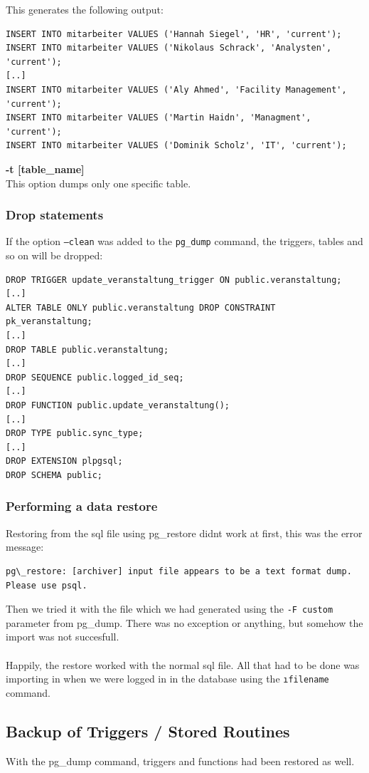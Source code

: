 \documentclass[10pt]{article}
\begin{document}
This generates the following output:
\begin{lstlisting}    
INSERT INTO mitarbeiter VALUES ('Hannah Siegel', 'HR', 'current');
INSERT INTO mitarbeiter VALUES ('Nikolaus Schrack', 'Analysten', 'current');
[..]
INSERT INTO mitarbeiter VALUES ('Aly Ahmed', 'Facility Management', 'current');
INSERT INTO mitarbeiter VALUES ('Martin Haidn', 'Managment', 'current');
INSERT INTO mitarbeiter VALUES ('Dominik Scholz', 'IT', 'current');
\end{lstlisting}    
\textbf{-t [table\_name]}\\
This option dumps only one specific table.
\subsubsection{Drop statements}
If the option \texttt{--clean} was added to the \texttt{pg\_dump} command, the triggers, tables and so on will be dropped:
\begin{lstlisting}    
DROP TRIGGER update_veranstaltung_trigger ON public.veranstaltung;
[..]
ALTER TABLE ONLY public.veranstaltung DROP CONSTRAINT pk_veranstaltung;
[..]
DROP TABLE public.veranstaltung;
[..]
DROP SEQUENCE public.logged_id_seq;
[..]
DROP FUNCTION public.update_veranstaltung();
[..]
DROP TYPE public.sync_type;
[..]
DROP EXTENSION plpgsql;
DROP SCHEMA public;
\end{lstlisting}    
\subsubsection{Performing a data restore}
Restoring from the sql file using pg\_restore didnt work at first, this was the error message:
\begin{lstlisting}    
pg\_restore: [archiver] input file appears to be a text format dump. Please use psql.
\end{lstlisting}    
Then we tried it with the file which we had generated using the \texttt{-F custom} parameter from pg\_dump.
There was no exception or anything, but somehow the import was not succesfull.
\\
\\
Happily, the restore worked with the normal sql file. All that had to be done was importing in when we were logged in in the database using the \texttt{\i filename} command.


\subsection{Backup of Triggers / Stored Routines}
With the pg\_dump command, triggers and functions had been restored as well.
\newpage
\end{document}
